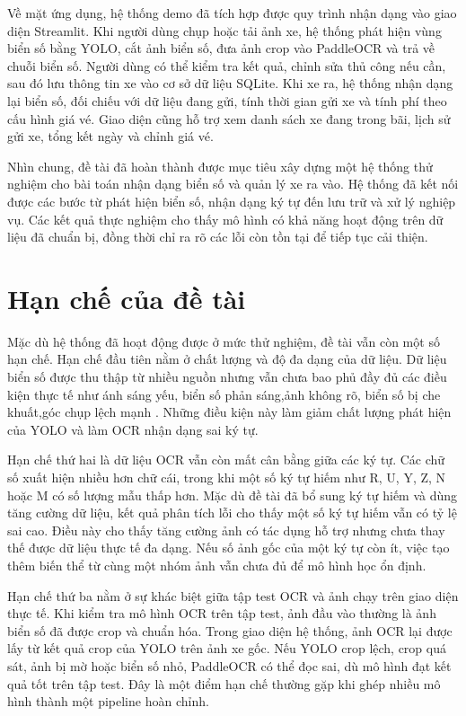 \documentclass[13pt,a4paper]{report}
\begin{document}
Về mặt ứng dụng, hệ thống demo đã tích hợp được quy trình nhận dạng vào giao diện Streamlit. Khi người dùng chụp hoặc tải ảnh xe, hệ thống phát hiện vùng biển số bằng YOLO, cắt ảnh biển số, đưa ảnh crop vào PaddleOCR và trả về chuỗi biển số. Người dùng có thể kiểm tra kết quả, chỉnh sửa thủ công nếu cần, sau đó lưu thông tin xe vào cơ sở dữ liệu SQLite. Khi xe ra, hệ thống nhận dạng lại biển số, đối chiếu với dữ liệu đang gửi, tính thời gian gửi xe và tính phí theo cấu hình giá vé. Giao diện cũng hỗ trợ xem danh sách xe đang trong bãi, lịch sử gửi xe, tổng kết ngày và chỉnh giá vé.

Nhìn chung, đề tài đã hoàn thành được mục tiêu xây dựng một hệ thống thử nghiệm cho bài toán nhận dạng biển số và quản lý xe ra vào. Hệ thống đã kết nối được các bước từ phát hiện biển số, nhận dạng ký tự đến lưu trữ và xử lý nghiệp vụ. Các kết quả thực nghiệm cho thấy mô hình có khả năng hoạt động trên dữ liệu đã chuẩn bị, đồng thời chỉ ra rõ các lỗi còn tồn tại để tiếp tục cải thiện.

\section{Hạn chế của đề tài}

Mặc dù hệ thống đã hoạt động được ở mức thử nghiệm, đề tài vẫn còn một số hạn chế. Hạn chế đầu tiên nằm ở chất lượng và độ đa dạng của dữ liệu. Dữ liệu biển số được thu thập từ nhiều nguồn nhưng vẫn chưa bao phủ đầy đủ các điều kiện thực tế như ánh sáng yếu, biển số phản sáng,ảnh không rõ, biển số bị che khuất,góc chụp lệch mạnh . Những điều kiện này làm giảm chất lượng phát hiện của YOLO và làm OCR nhận dạng sai ký tự.

Hạn chế thứ hai là dữ liệu OCR vẫn còn mất cân bằng giữa các ký tự. Các chữ số xuất hiện nhiều hơn chữ cái, trong khi một số ký tự hiếm như R, U, Y, Z, N hoặc M có số lượng mẫu thấp hơn. Mặc dù đề tài đã bổ sung ký tự hiếm và dùng tăng cường dữ liệu, kết quả phân tích lỗi cho thấy một số ký tự hiếm vẫn có tỷ lệ sai cao. Điều này cho thấy tăng cường ảnh có tác dụng hỗ trợ nhưng chưa thay thế được dữ liệu thực tế đa dạng. Nếu số ảnh gốc của một ký tự còn ít, việc tạo thêm biến thể từ cùng một nhóm ảnh vẫn chưa đủ để mô hình học ổn định.

Hạn chế thứ ba nằm ở sự khác biệt giữa tập test OCR và ảnh chạy trên giao diện thực tế. Khi kiểm tra mô hình OCR trên tập test, ảnh đầu vào thường là ảnh biển số đã được crop và chuẩn hóa. Trong giao diện hệ thống, ảnh OCR lại được lấy từ kết quả crop của YOLO trên ảnh xe gốc. Nếu YOLO crop lệch, crop quá sát, ảnh bị mờ hoặc biển số nhỏ, PaddleOCR có thể đọc sai, dù mô hình đạt kết quả tốt trên tập test. Đây là một điểm hạn chế thường gặp khi ghép nhiều mô hình thành một pipeline hoàn chỉnh.
\end{document}
